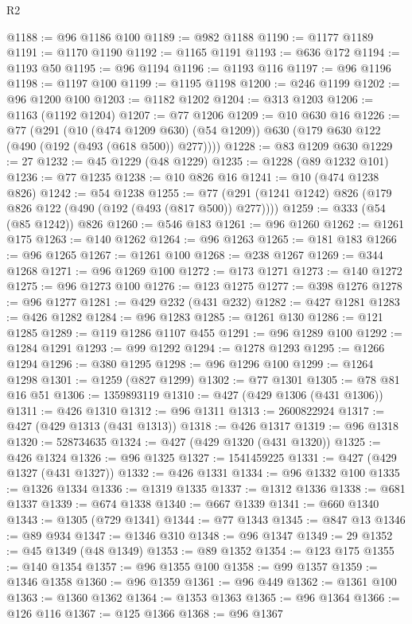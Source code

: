 \begin{lexlean}{R2}
\begin{coremodule}
@1188 := @96 @1186 @100
@1189 := @982 @1188
@1190 := @1177 @1189
@1191 := @1170 @1190
@1192 := @1165 @1191
@1193 := @636 @172
@1194 := @1193 @50
@1195 := @96 @1194
@1196 := @1193 @116
@1197 := @96 @1196
@1198 := @1197 @100
@1199 := @1195 @1198
@1200 := @246 @1199
@1202 := @96 @1200 @100
@1203 := @1182 @1202
@1204 := @313 @1203
@1206 := @1163 (@1192 @1204)
@1207 := @77 @1206
@1209 := @10 @630 @16
@1226 := @77
    (@291
      (@10 (@474 @1209 @630) (@54 @1209))
      @630
      (@179 @630 @122 (@490 (@192 (@493 (@618 @500)) @277))))
@1228 := @83 @1209 @630
@1229 := 27
@1232 := @45 @1229 (@48 @1229)
@1235 := @1228 (@89 @1232 @101)
@1236 := @77 @1235
@1238 := @10 @826 @16
@1241 := @10 (@474 @1238 @826)
@1242 := @54 @1238
@1255 := @77 (@291 (@1241 @1242) @826 (@179 @826 @122 (@490 (@192 (@493 (@817 @500)) @277))))
@1259 := @333 (@54 (@85 @1242)) @826
@1260 := @546 @183
@1261 := @96 @1260
@1262 := @1261 @175
@1263 := @140 @1262
@1264 := @96 @1263
@1265 := @181 @183
@1266 := @96 @1265
@1267 := @1261 @100
@1268 := @238 @1267
@1269 := @344 @1268
@1271 := @96 @1269 @100
@1272 := @173 @1271
@1273 := @140 @1272
@1275 := @96 @1273 @100
@1276 := @123 @1275
@1277 := @398 @1276
@1278 := @96 @1277
@1281 := @429 @232 (@431 @232)
@1282 := @427 @1281
@1283 := @426 @1282
@1284 := @96 @1283
@1285 := @1261 @130
@1286 := @121 @1285
@1289 := @119 @1286 @1107 @455
@1291 := @96 @1289 @100
@1292 := @1284 @1291
@1293 := @99 @1292
@1294 := @1278 @1293
@1295 := @1266 @1294
@1296 := @380 @1295
@1298 := @96 @1296 @100
@1299 := @1264 @1298
@1301 := @1259 (@827 @1299)
@1302 := @77 @1301
@1305 := @78 @81 @16 @51
@1306 := 1359893119
@1310 := @427 (@429 @1306 (@431 @1306))
@1311 := @426 @1310
@1312 := @96 @1311
@1313 := 2600822924
@1317 := @427 (@429 @1313 (@431 @1313))
@1318 := @426 @1317
@1319 := @96 @1318
@1320 := 528734635
@1324 := @427 (@429 @1320 (@431 @1320))
@1325 := @426 @1324
@1326 := @96 @1325
@1327 := 1541459225
@1331 := @427 (@429 @1327 (@431 @1327))
@1332 := @426 @1331
@1334 := @96 @1332 @100
@1335 := @1326 @1334
@1336 := @1319 @1335
@1337 := @1312 @1336
@1338 := @681 @1337
@1339 := @674 @1338
@1340 := @667 @1339
@1341 := @660 @1340
@1343 := @1305 (@729 @1341)
@1344 := @77 @1343
@1345 := @847 @13
@1346 := @89 @934
@1347 := @1346 @310
@1348 := @96 @1347
@1349 := 29
@1352 := @45 @1349 (@48 @1349)
@1353 := @89 @1352
@1354 := @123 @175
@1355 := @140 @1354
@1357 := @96 @1355 @100
@1358 := @99 @1357
@1359 := @1346 @1358
@1360 := @96 @1359
@1361 := @96 @449
@1362 := @1361 @100
@1363 := @1360 @1362
@1364 := @1353 @1363
@1365 := @96 @1364
@1366 := @126 @116
@1367 := @125 @1366
@1368 := @96 @1367

\end{coremodule}
\end{lexlean}
